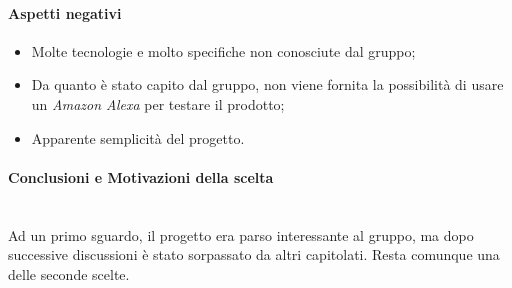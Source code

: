 \paragraph{Aspetti negativi}
\begin{itemize}
	\item Molte tecnologie e molto specifiche non conosciute dal gruppo;
	\item Da quanto è stato capito dal gruppo, non viene fornita la possibilità di usare un \textit{Amazon Alexa} per testare il prodotto;
	\item Apparente semplicità del progetto.
\end{itemize}

\paragraph{Conclusioni e Motivazioni della scelta}\-\\
Ad un primo sguardo, il progetto era parso interessante al gruppo, ma dopo successive discussioni è stato sorpassato da altri capitolati. Resta comunque una delle seconde scelte.
